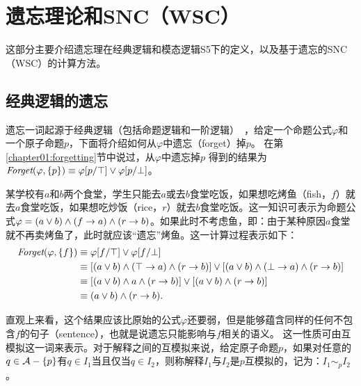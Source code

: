 \section{遗忘理论和SNC（WSC）}
这部分主要介绍遗忘理在经典逻辑和模态逻辑S5下的定义，以及基于遗忘的SNC（WSC）的计算方法。
\subsection{经典逻辑的遗忘}\label{chapter:sub:proforgetting}
遗忘一词起源于经典逻辑（包括命题逻辑和一阶逻辑）~\cite{lin1994forget}，给定一个命题公式$\varphi$和一个原子命题$p$，下面将介绍如何从$\varphi$中遗忘（forget）掉$p$。
在第\ref{chapter01:forgetting}节中说过，从$\varphi$中遗忘掉$p$ 得到的结果为$\textit{Forget}(\varphi, \{p\}) \equiv \varphi[p/\top] \vee \varphi[p/\bot]$。


\begin{example}\label{exmp:fish}
	某学校有$a$和$b$两个食堂，学生只能去$a$或去$b$食堂吃饭，如果想吃烤鱼（fish，$f$）就去$a$食堂吃饭，如果想吃炒饭（rice，$r$）就去$b$食堂吃饭。这一知识可表示为命题公式$\varphi=(a \vee b) \wedge (f\rightarrow a) \wedge (r \rightarrow b)$。如果此时不考虑鱼，即：由于某种原因$a$食堂就不再卖烤鱼了，此时就应该“遗忘”烤鱼。这一计算过程表示如下：
	\begin{align*}
		\textit{Forget}(\varphi, \{f\}) & \equiv \varphi[f/\top] \vee \varphi[f/\bot] \\
		& \equiv [(a \vee b) \wedge (\top \rightarrow a) \wedge (r \rightarrow b)] \vee  [(a \vee b) \wedge (\bot \rightarrow a) \wedge (r \rightarrow b)]\\
		& \equiv [(a \vee b) \wedge a \wedge (r \rightarrow b)] \vee  [(a \vee b) \wedge (r \rightarrow b)]\\
		& \equiv (a \vee b) \wedge (r \rightarrow b).
	\end{align*}
\end{example}

直观上来看，这个结果应该比原始的公式$\varphi$还要弱，但是能够蕴含同样的任何不包含$f$的句子（sentence），也就是说遗忘只能影响与$f$相关的语义。
这一性质可由互模拟这一词来表示。对于解释之间的互模拟来说，给定原子命题$p$，如果对任意的$q\in {\cal A}-\{p\}$有$q \in I_1$当且仅当$q \in I_2$，则称解释$I_1$与$I_2$是$p$互模拟的，记为：$I_1 \sim_{p} I_2$。


